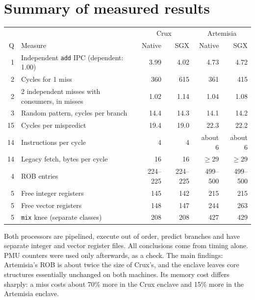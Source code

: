\documentclass[10pt]{article}
\newcommand{\code}[1]{\texttt{#1}}
\begin{document}
\section*{Summary of measured results}
\begin{center}
\small
\begin{tabular}{rlrrrr}
\toprule
 & & \multicolumn{2}{c}{Crux} & \multicolumn{2}{c}{Artemisia}\\
Q & Measure & Native & SGX & Native & SGX\\
\midrule
1 & Independent \code{add} IPC (dependent: 1.00) & 3.99 & 4.02 & 4.73 & 4.72\\
2 & Cycles for 1 miss & 360 & 615 & 361 & 415\\
2 & 2 independent misses with consumers, in misses & 1.02 & 1.14 & 1.04 & 1.08\\
3 & Random pattern, cycles per branch & 14.4 & 14.3 & 14.1 & 14.2\\
15 & Cycles per mispredict & 19.4 & 19.0 & 22.3 & 22.2\\
14 & Instructions per cycle & 4 & 4 & about 6 & about 6\\
14 & Legacy fetch, bytes per cycle & 16 & 16 & $\geq$29 & $\geq$29\\
4 & ROB entries & 224--225 & 224--225 & 499--500 & 499--500\\
5 & Free integer registers & 145 & 142 & 215 & 215\\
5 & Free vector registers & 148 & 147 & 244 & 263\\
5 & \code{mix} knee (separate classes) & 208 & 208 & 427 & 429\\
\bottomrule
\end{tabular}
\end{center}
Both processors are pipelined, execute out of order, predict branches and have separate integer and vector register files.
All conclusions come from timing alone. PMU counters were used only afterwards, as a check.
The main findings: Artemisia's ROB is about twice the size of Crux's, and the enclave leaves core structures
essentially unchanged on both machines. Its memory cost differs sharply: a miss costs about 70\% more in the Crux enclave and 15\% more in the Artemisia enclave.
\end{document}
